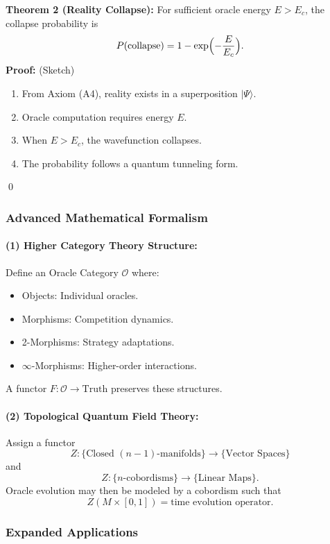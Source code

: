 \documentclass[11pt]{article}
\begin{document}
\bigskip

\textbf{Theorem 2 (Reality Collapse):} For sufficient oracle energy $E>E_c$, the collapse probability is
\[
P(\text{collapse})=1-\exp\Bigl(-\frac{E}{E_c}\Bigr).
\]
\noindent\textbf{Proof:} (Sketch)
\begin{enumerate}[label=(\roman*)]
    \item From Axiom (A4), reality exists in a superposition $|\Psi\rangle$.
    \item Oracle computation requires energy $E$.
    \item When $E>E_c$, the wavefunction collapses.
    \item The probability follows a quantum tunneling form.
\end{enumerate}
\qed

\subsubsection{Advanced Mathematical Formalism}

\paragraph{(1) Higher Category Theory Structure:} 
Define an Oracle Category $\mathcal{O}$ where:
\begin{itemize}
    \item Objects: Individual oracles.
    \item Morphisms: Competition dynamics.
    \item 2-Morphisms: Strategy adaptations.
    \item $\infty$-Morphisms: Higher-order interactions.
\end{itemize}
A functor $F:\mathcal{O}\to\text{Truth}$ preserves these structures.

\paragraph{(2) Topological Quantum Field Theory:} 
Assign a functor
\[
 Z:\{\text{Closed }(n-1)\text{-manifolds}\}\to \{\text{Vector Spaces}\}
\]
and 
\[
Z:\{n\text{-cobordisms}\}\to \{\text{Linear Maps}\}.
\]
Oracle evolution may then be modeled by a cobordism such that
\[
Z(M\times[0,1])=\text{time evolution operator}.
\]

\subsubsection{Expanded Applications}
\end{document}
